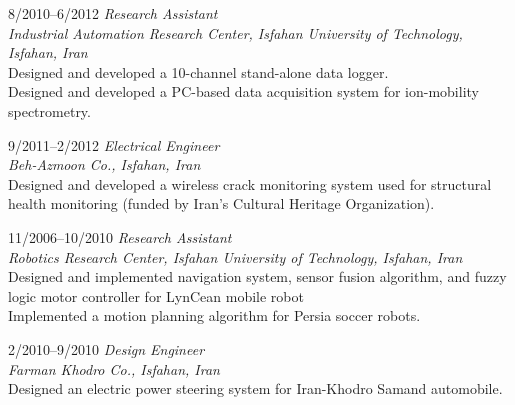 \documentclass[10pt]{article}
\newlength{\Vspace}
\newlength{\Vspace}
\begin{document}
\begin{CV}
\item[8/2010--6/2012] \textit{Research Assistant} \\
    \textit{Industrial Automation Research Center, Isfahan University of Technology, Isfahan, Iran}\vspace{\Vspace} \\
    Designed and developed a 10-channel stand-alone data logger. \\
    Designed and developed a PC-based data acquisition system for ion-mobility spectrometry.

\item[9/2011--2/2012] \textit{Electrical Engineer} \\
    \textit{Beh-Azmoon Co., Isfahan, Iran}\vspace{\Vspace} \\
    Designed and developed a wireless crack monitoring system used for structural health monitoring (funded by Iran's Cultural Heritage Organization).

\item[11/2006--10/2010] \textit{Research Assistant} \\
    \textit{Robotics Research Center, Isfahan University of Technology, Isfahan, Iran}\vspace{\Vspace} \\
    Designed and implemented navigation system, sensor fusion algorithm, and fuzzy logic motor controller for LynCean mobile robot \\
    Implemented a motion planning algorithm for Persia soccer robots.

\item[2/2010--9/2010] \textit{Design Engineer} \\
    \textit{Farman Khodro Co., Isfahan, Iran}\vspace{\Vspace} \\
    Designed an electric power steering system for Iran-Khodro Samand automobile.



\end{CV}
\end{document}
